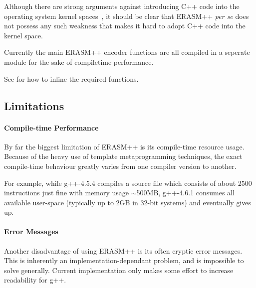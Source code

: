 \documentclass{article}
\begin{document}
Although there are strong arguments against introducing C++ code
into the operating system kernel
spaces~\cite{linux:cpp_kernel}\cite{ms:cpp_kernel}, it should be clear
that ERASM++ \textit{per se} does not possess any such weakness that
makes it hard to adopt C++ code into the kernel space.

Currently the main ERASM++ encoder functions are all compiled in a
seperate module for the sake of compile\-time performance. 

See  for how to inline the required
functions.

\subsection{Limitations}
\label{sec:erasm-limitations}

\paragraph{Compile-time Performance}
\label{sec:comp-time-perf}

By far the biggest limitation of ERASM++ is its compile-time resource
usage. Because of the heavy use of template metaprogramming
techniques, the exact compile-time behaviour greatly varies from one
compiler version to another.

For example, while g++-4.5.4 compiles a source file which consists of
about 2500 instructions just fine with memory usage $\sim$500MB,
g++-4.6.1 consumes all available user-space (typically up to 2GB in
32-bit systems) and eventually gives up.

\paragraph{Error Messages}
\label{sec:error-messages}

Another disadvantage of using ERASM++ is its often cryptic error
messages.  This is inherently an implementation-dependant problem, and
is impossible to solve generally. Current implementation only makes
some effort to increase readability for g++.
\end{document}
